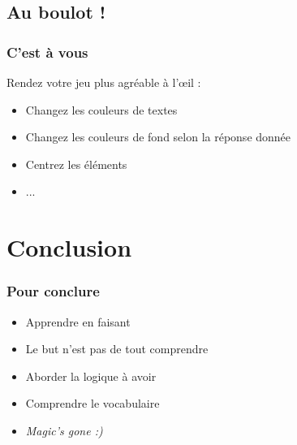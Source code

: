 \documentclass{beamer}
\begin{document}
	\subsection{Au boulot !}
	\begin{frame}
		\frametitle{C'est à vous}
		Rendez votre jeu plus agréable à l’œil :
		\begin{itemize}
			\item Changez les couleurs de textes
			\item Changez les couleurs de fond selon la réponse donnée
			\item Centrez les éléments
			\item ...
		\end{itemize}
	\end{frame}

	\section{Conclusion}
	\begin{frame}
		\frametitle{Pour conclure}
		\begin{itemize}
			\item Apprendre en faisant
			\item Le but n'est pas de tout comprendre
			\item Aborder la logique à avoir
			\item Comprendre le vocabulaire
			\item \emph{Magic's gone :)}
		\end{itemize}
	\end{frame}
	
\end{document}
